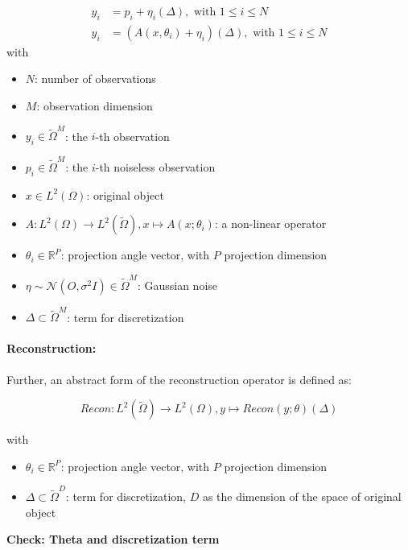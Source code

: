 \begin{equation}
    \label{eq:abstract-model}
    \begin{aligned}
        y_i &= p_i + \eta_i (\Delta), \text{ with } 1 \leq i \leq N \\
        y_i &= \left( A(x, \theta_i) + \eta_i \right) (\Delta), \text{ with } 1 \leq i \leq N 
    \end{aligned}
\end{equation}
with
\begin{itemize}
    \item $N$: number of observations
    \item $M$: observation dimension
    \item $y_i \in \tilde{\Omega}^M$: the $i$-th observation
    \item $p_i \in \tilde{\Omega}^M$: the $i$-th noiseless observation
    \item $x \in L^2(\Omega)$: original object
    \item $A: L^2(\Omega) \to L^2(\tilde{\Omega}), x \mapsto A(x; \theta_i)$: a non-linear operator 
    \item $\theta_i \in \mathbb{R}^P$: projection angle vector, with $P$ projection dimension
    \item $\eta \sim \mathcal{N}(O, \sigma^2 I) \in \tilde{\Omega}^M$: Gaussian noise
    \item $\Delta \subset \tilde{\Omega}^{M}$: term for discretization
\end{itemize}

\paragraph{Reconstruction:}
Further, an abstract form of the reconstruction operator is defined as:

\begin{equation}
    \textit{Recon} : L^2(\tilde{\Omega}) \to L^2(\Omega), y \mapsto Recon(y; \theta) (\Delta)
\end{equation}

with
\begin{itemize}
    \item $\theta_i \in \mathbb{R}^P$: projection angle vector, with $P$ projection dimension
    \item $\Delta \subset \tilde{\Omega}^{D}$: term for discretization, $D$ as the dimension of the space of original object
\end{itemize}

\textbf{Check: Theta and discretization term}

